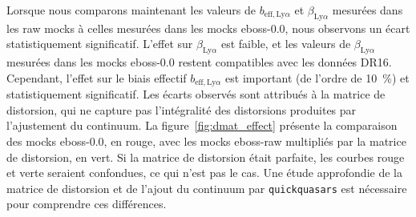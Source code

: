 Lorsque nous comparons maintenant les valeurs de $b_{\mathrm{eff},\mathrm{Ly}\alpha}$ et $\beta_{\mathrm{Ly}\alpha}$ mesurées dans les raw mocks à celles mesurées dans les mocks eboss-0.0, nous observons un écart statistiquement significatif.
L'effet sur $\beta_{\mathrm{Ly}\alpha}$ est faible, et les valeurs de $\beta_{\mathrm{Ly}\alpha}$ mesurées dans les mocks eboss-0.0 restent compatibles avec les données DR16.
Cependant, l'effet sur le biais effectif $b_{\mathrm{eff},\mathrm{Ly}\alpha}$ est important (de l'ordre de \SI{10}{\percent}) et statistiquement significatif.
Les écarts observés sont attribués à la matrice de distorsion, qui ne capture pas l'intégralité des distorsions produites par l'ajustement du continuum.
La figure~\ref{fig:dmat_effect} présente la comparaison des mocks eboss-0.0, en rouge, avec les mocks eboss-raw multipliés par la matrice de distorsion, en vert. Si la matrice de distorsion était parfaite, les courbes rouge et verte seraient confondues, ce qui n'est pas le cas. Une étude approfondie de la matrice de distorsion et de l'ajout du continuum par \texttt{quickquasars} est nécessaire pour comprendre ces différences.
